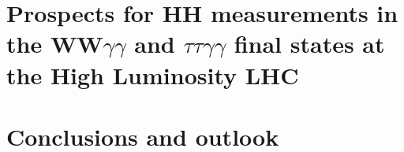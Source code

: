 \documentclass[thesis]{neu}
\begin{document}
\chapter{Prospects for HH measurements in the WW\texorpdfstring{$\gamma\gamma$}{yy} and \texorpdfstring{$\tau\tau\gamma\gamma$}{tautauyy} final states at the High Luminosity LHC} \label{chapter:Phase_II_HH}


\chapter{Conclusions and outlook} \label{chapter:summary}




    
{
    \clearpage
    \appendix
    
    
    \clearpage
    
    \clearpage
    
    \clearpage
    
    
} 
{
}      
\end{document}
